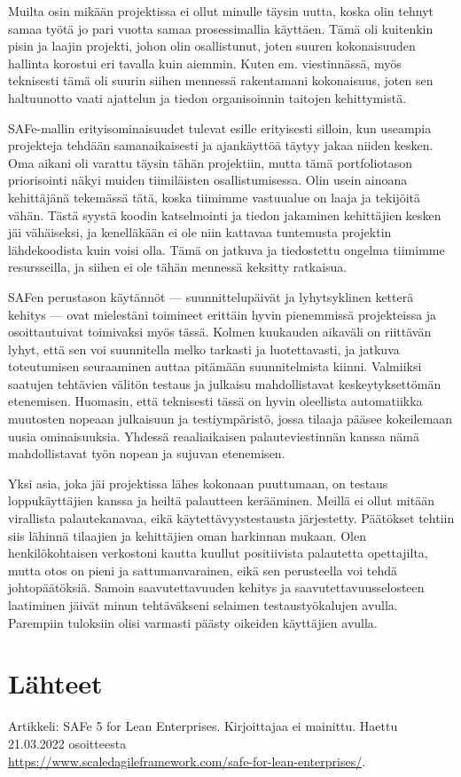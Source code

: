 \documentclass{article}
\begin{document}
Muilta osin mikään projektissa ei ollut minulle täysin uutta, koska olin tehnyt
samaa työtä jo pari vuotta samaa prosessimallia käyttäen. Tämä oli kuitenkin
pisin ja laajin projekti, johon olin osallistunut, joten suuren kokonaisuuden
hallinta korostui eri tavalla kuin aiemmin. Kuten em. vies\-tinnässä, myös
teknisesti tämä oli suurin siihen mennessä rakentamani kokonaisuus, joten sen
hal\-tuun\-otto vaati ajattelun ja tiedon organisoinnin taitojen kehittymistä.

SAFe-mallin erityisominaisuudet tulevat esille erityisesti silloin, kun
useampia projekteja tehdään samanaikai\-sesti ja ajankäyttöä täytyy jakaa
niiden kesken. Oma aikani oli varattu täysin tähän projektiin, mutta tämä
portfoliotason priorisointi näkyi muiden tiimiläisten osallistumisessa. Olin
usein ainoana kehittäjänä tekemässä tätä, koska tiimimme vastuualue on laaja ja
tekijöitä vähän. Tästä syystä koodin katselmointi ja tiedon jakaminen
kehittäjien kesken jäi vähäiseksi, ja kenelläkään ei ole niin kattavaa
tuntemusta projektin lähdekoodista kuin voisi olla. Tämä on jatkuva ja
tiedostettu ongelma tiimimme resursseilla, ja siihen ei ole tähän mennessä
keksitty ratkaisua.

SAFen perustason käytännöt — suunnittelupäivät ja lyhytsyklinen ketterä kehitys
— ovat mielestäni toimineet erittäin hyvin pienemmissä projekteissa ja
osoittautuivat toimivaksi myös tässä. Kolmen kuukauden aikaväli on riittävän
lyhyt, että sen voi suunnitella melko tarkasti ja luotettavasti, ja jatkuva
toteutumisen seuraaminen auttaa pitämään suunnitelmista kiinni. Valmiik\-si
saatujen tehtävien välitön testaus ja julkaisu mahdollistavat keskeytyksettömän
etenemisen. Huomasin, että teknisesti tässä on hyvin oleellista automatiikka
muutosten nopeaan julkai\-suun ja testiympäristö, jossa tilaaja pääsee
kokeilemaan uusia ominaisuuksia. Yhdessä reaali\-aikaisen palauteviestinnän
kanssa nämä mahdollistavat työn nopean ja sujuvan etenemisen.

Yksi asia, joka jäi projektissa lähes kokonaan puuttumaan, on testaus
loppukäyttäjien kanssa ja heiltä palautteen kerääminen. Meillä ei ollut mitään
virallista palautekanavaa, eikä käytettävyystestausta järjestetty. Päätökset
tehtiin siis lähinnä tilaajien ja kehittäjien oman harkinnan mukaan. Olen
henkilökohtaisen verkostoni kautta kuullut positiivista palautetta opettajilta,
mutta otos on pieni ja sattumanvarainen, eikä sen perusteella voi tehdä
johtopäätöksiä. Samoin saavutettavuuden kehitys ja saavutettavuusselosteen
laatiminen jäivät minun tehtäväkseni selaimen testaustyökalujen avulla.
Parempiin tuloksiin olisi varmasti päästy oikeiden käyttäjien avulla.

\section{Lähteet}

Artikkeli: SAFe 5 for Lean Enterprises. Kirjoittajaa ei mainittu. Haettu 21.03.2022 osoitteesta
\\ \url{https://www.scaledagileframework.com/safe-for-lean-enterprises/}.
\end{document}
